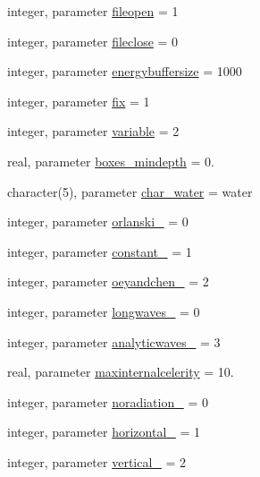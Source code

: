 \begin{DoxyCompactItemize}
\item 
integer, parameter \mbox{\hyperlink{namespacemodulehydrodynamic_aa4ad740c2db59b8989dc3b2d36df55e1}{fileopen}} = 1
\item 
integer, parameter \mbox{\hyperlink{namespacemodulehydrodynamic_ad6e8be842adda6d1ba720cb98e07c97c}{fileclose}} = 0
\item 
integer, parameter \mbox{\hyperlink{namespacemodulehydrodynamic_a1975a4833b98bfa1952ccaa94ff3aefd}{energybuffersize}} = 1000
\item 
integer, parameter \mbox{\hyperlink{namespacemodulehydrodynamic_a5fa642d0dd66cf229c8006ada4b3b94f}{fix}} = 1
\item 
integer, parameter \mbox{\hyperlink{namespacemodulehydrodynamic_a51cc729c6be952db84e6f51bc75a59aa}{variable}} = 2
\item 
real, parameter \mbox{\hyperlink{namespacemodulehydrodynamic_ab09faae6f85b0c6a4f7ac6ba7ca019eb}{boxes\+\_\+mindepth}} = 0.
\item 
character(5), parameter \mbox{\hyperlink{namespacemodulehydrodynamic_a2d70746f75e0e069bb2d66e5960ae5ae}{char\+\_\+water}} = \textquotesingle{}water\textquotesingle{}
\item 
integer, parameter \mbox{\hyperlink{namespacemodulehydrodynamic_a73d0342a55e53e1134834b19e62e3930}{orlanski\+\_\+}} = 0
\item 
integer, parameter \mbox{\hyperlink{namespacemodulehydrodynamic_ad91ecb74d9675d514a8723daee9edd08}{constant\+\_\+}} = 1
\item 
integer, parameter \mbox{\hyperlink{namespacemodulehydrodynamic_adff8a3079675a9f7457aed3e2c500949}{oeyandchen\+\_\+}} = 2
\item 
integer, parameter \mbox{\hyperlink{namespacemodulehydrodynamic_afbe1f8eb9cfc7c071c049f6ac349fd18}{longwaves\+\_\+}} = 0
\item 
integer, parameter \mbox{\hyperlink{namespacemodulehydrodynamic_a7b25a5daf5e06e631e33916152f8f8da}{analyticwaves\+\_\+}} = 3
\item 
real, parameter \mbox{\hyperlink{namespacemodulehydrodynamic_a3f051f5fd886733770b855f1afdda6f5}{maxinternalcelerity}} = 10.
\item 
integer, parameter \mbox{\hyperlink{namespacemodulehydrodynamic_aefcd852a9a3726b9de7cc774ff3b63c4}{noradiation\+\_\+}} = 0
\item 
integer, parameter \mbox{\hyperlink{namespacemodulehydrodynamic_aff08683bf75b6e58f88d991bf6de6fc6}{horizontal\+\_\+}} = 1
\item 
integer, parameter \mbox{\hyperlink{namespacemodulehydrodynamic_ab1157985a2a599fa0fe1de995f09acb0}{vertical\+\_\+}} = 2

\end{DoxyCompactItemize}
